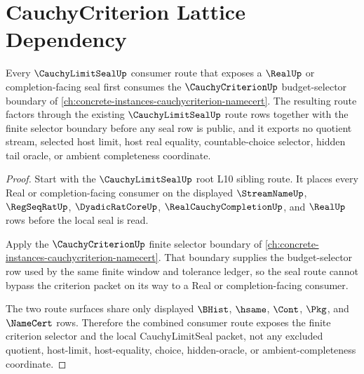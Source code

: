 \section{CauchyCriterion Lattice Dependency}
\label{sec:cauchy-limit-seal-cauchycriterion-lattice-dependency}

\begin{theorem}
\label{thm:cauchy-limit-seal-cauchycriterion-lattice-dependency}
Every $\CauchyLimitSealUp$ consumer route that exposes a $\RealUp$ or completion-facing seal first consumes the $\CauchyCriterionUp$ budget-selector boundary of \autoref{ch:concrete-instances-cauchycriterion-namecert}. The resulting route factors through the existing $\CauchyLimitSealUp$ route rows together with the finite selector boundary before any seal row is public, and it exports no quotient stream, selected host limit, host real equality, countable-choice selector, hidden tail oracle, or ambient completeness coordinate.
\end{theorem}
\begin{proof}
Start with the $\CauchyLimitSealUp$ root L10 sibling route. It places every Real or completion-facing consumer on the displayed $\StreamNameUp$, $\RegSeqRatUp$, $\DyadicRatCoreUp$, $\RealCauchyCompletionUp$, and $\RealUp$ rows before the local seal is read.

Apply the $\CauchyCriterionUp$ finite selector boundary of \autoref{ch:concrete-instances-cauchycriterion-namecert}. That boundary supplies the budget-selector row used by the same finite window and tolerance ledger, so the seal route cannot bypass the criterion packet on its way to a Real or completion-facing consumer.

The two route surfaces share only displayed $\BHist$, $\hsame$, $\Cont$, $\Pkg$, and $\NameCert$ rows. Therefore the combined consumer route exposes the finite criterion selector and the local CauchyLimitSeal packet, not any excluded quotient, host-limit, host-equality, choice, hidden-oracle, or ambient-completeness coordinate.
\end{proof}
